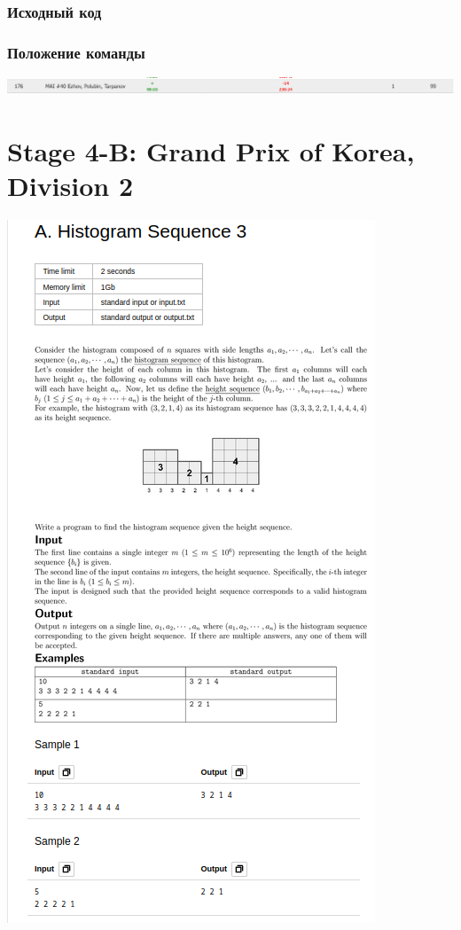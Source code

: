 \documentclass[12pt]{article}
\begin{document}
\subsubsection*{Исходный код}

\subsubsection*{Положение команды}
\includegraphics[scale=0.35]{images/Vsesib.png}\newline\noindent

\pagebreak
\section{Stage 4-B: Grand Prix of Korea, Division 2}
\includegraphics[scale=0.75]{statements/4_A.png}
\end{document}
